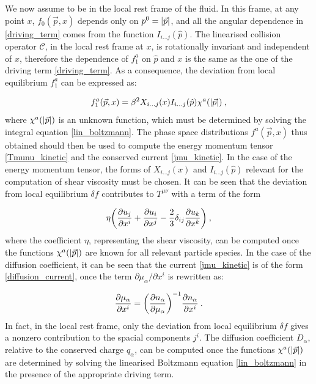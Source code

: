 We now assume to be in the local rest frame of the fluid. In this frame, at any point $x$, $f_0(\vec p,x)$ depends only on $p^0 = \abs{\vec p}$, and all the angular dependence in \ref{driving_term} comes from the function $I_{i \dots j}(\hat p)$. The linearised collision operator $\mathcal{C}$, in the local rest frame at $x$, is rotationally invariant and independent of $x$, therefore the dependence of $f_1^a$ on $\hat p$ and $x$ is the same as the one of the driving term \ref{driving_term}. As a consequence, the deviation from local equilibrium $f_1^a$ can be expressed as:
 
 \begin{equation}
 f_1^a (\vec p,x) = \beta^2 X_{i \dots j} (x) I_{i \dots j} (\hat p) \chi^a(\abs{\vec p}) \: ,
 \label{f1}
 \end{equation}
 where $\chi^a(\abs{\vec p})$ is an unknown function, which must be determined by solving the integral equation \ref{lin_boltzmann}. The phase space distributions $f^a(\vec p,x)$ thus obtained should then be used to compute the energy momentum tensor \ref{Tmunu_kinetic}  and the conserved current \ref{jmu_kinetic}. In the case of the energy momentum tensor, the forms of $X_{i \dots j}(x)$ and $I_{i \dots j}(\hat p)$ relevant for the computation of shear viscosity must be chosen. It can be seen that the deviation from local equilibrium $\delta f$ contributes to $T^{\mu\nu}$ with a term of the form
 
 \begin{equation}
 \eta \biggl( \frac{\partial  u_j}{\partial x^i}  + \frac{\partial  u_i}{\partial x^j}  -\frac{2}{3} \delta_{ij} \frac{\partial  u_k}{\partial x^k}  \biggr) \: ,
 \end{equation} 
where the coefficient $\eta$, representing the shear viscosity, can be computed once the functions $\chi^a(\abs{\vec p})$ are known for all relevant particle species. In the case of the diffusion coefficient, it can be seen that the current \ref{jmu_kinetic} is of the form \ref{diffusion_current}, once the term $\partial \mu_{\alpha}/\partial x^i$ is rewritten as:

\begin{equation}
\frac{\partial \mu_{\alpha} }{\partial x^i}  = \biggl(\frac{\partial n_{\alpha}}{\partial  \mu_{\alpha}}\biggr)^{-1} \frac{\partial n_{\alpha} }{\partial x^i}  \: .
\end{equation}
%
In fact, in the local rest frame, only the deviation from local equilibrium $\delta f$ gives a nonzero contribution to the spacial components $j^i$.
The diffusion coefficient $D_{\alpha}$, relative to the conserved charge $q_{\alpha}$, can be computed once the functions $\chi^a(\abs{\vec p})$ are determined by solving the linearised Boltzmann equation \ref{lin_boltzmann} in the presence of the appropriate driving term.

